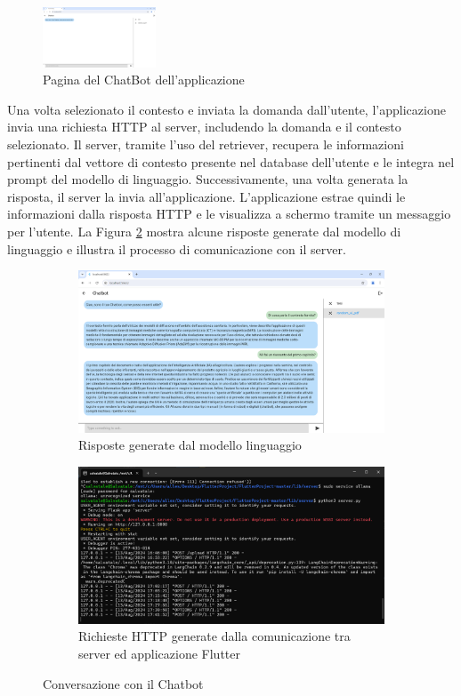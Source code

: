 \begin{figure}[ht]
	\centering
	\includegraphics[width=0.3\textwidth]{Immagini/chatbot_page.png}
	\caption{Pagina del ChatBot dell'applicazione}
	\label{fig:chatbot}
\end{figure}
Una volta selezionato il contesto e inviata la domanda dall'utente, l'applicazione invia una richiesta HTTP al server, includendo la domanda e il contesto selezionato. Il server, tramite l'uso del retriever, recupera le informazioni pertinenti dal vettore di contesto presente nel database dell'utente e le integra nel prompt del modello di linguaggio. Successivamente, una volta generata la risposta, il server la invia all'applicazione. L'applicazione estrae quindi le informazioni dalla risposta HTTP e le visualizza a schermo tramite un messaggio per l'utente.
La Figura \ref{fig:chat} mostra alcune risposte generate dal modello di linguaggio e illustra il processo di comunicazione con il server.

\begin{figure}[H]
	\centering
        \begin{subfigure}{.5\textwidth}
		\centering
		\includegraphics[width=0.45\linewidth]{Immagini/chat_example.png}
		\caption{Risposte generate dal modello linguaggio\newline}
	\end{subfigure}%
        \begin{subfigure}{.5\textwidth}
		\centering
		\includegraphics[width=0.45\linewidth]{Immagini/http_connections_during_conversation.png}
		\caption{Richieste HTTP generate dalla comunicazione tra server ed applicazione Flutter\newline}
	\end{subfigure}%
	\caption{Conversazione con il Chatbot}
        \label{fig:chat}
\end{figure}


